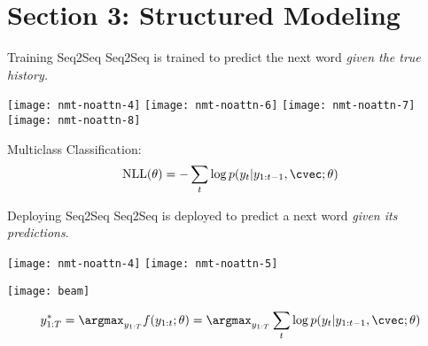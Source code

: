 
\section{Section 3: Structured Modeling }

\begin{frame}{Training Seq2Seq}
  Seq2Seq is trained to predict the next word \textit{given the true history.}

  \begin{center}
  \texttt{[image: nmt-noattn-4]}
  \texttt{[image: nmt-noattn-6]}
  \texttt{[image: nmt-noattn-7]}
  \texttt{[image: nmt-noattn-8]}
  \end{center}
  Multiclass Classification:
  \[ \text{NLL}(\theta) = -\sum_{t} \log p(y_t |  y_{1:t-1}, \cvec; \theta) \] 
\end{frame}

\begin{frame}{Deploying Seq2Seq}
  Seq2Seq is deployed to predict a next word \textit{given its predictions}.


  \begin{center}
  \texttt{[image: nmt-noattn-4]}
  \texttt{[image: nmt-noattn-5]}

  \texttt{[image: beam]}


  \end{center}

  \[ y^*_{1:T} = \argmax_{y_{1:T}} f(y_{1:t}; \theta) = \argmax_{y_{1:T}} \sum_{t} \log p(y_{t} | y_{1:t-1}, \cvec; \theta) \] 
\end{frame}

